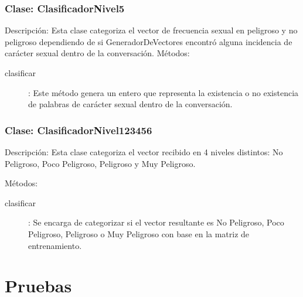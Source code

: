 \subsubsection{Clase: ClasificadorNivel5}
Descripci\'on: Esta clase categoriza el vector de frecuencia sexual en peligroso y no peligroso dependiendo de si GeneradorDeVectores encontr\'o alguna incidencia de car\'acter sexual dentro de la conversaci\'on.  
M\'etodos:
\begin{description}
\item[clasificar]: Este m\'etodo genera un entero que representa la existencia o no existencia de palabras de car\'acter sexual dentro de la conversaci\'on. 
\end{description}

\subsubsection{Clase: ClasificadorNivel123456}
Descripci\'on: Esta clase categoriza el vector recibido en 4 niveles distintos: No Peligroso, Poco Peligroso, Peligroso y Muy Peligroso.

M\'etodos:
\begin{description}
\item[clasificar]: Se encarga de categorizar si el vector resultante es No Peligroso, Poco Peligroso, Peligroso o Muy Peligroso con base en la matriz de entrenamiento.
\end{description}

\section{Pruebas}



